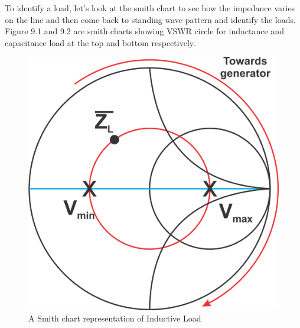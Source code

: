 To identify a load, let's look at the smith chart to see how the impedance varies on the line and then come back to standing wave pattern and identify the loads.\\
Figure 9.1 and 9.2 are smith charts showing VSWR circle for inductance and capacitance load at the top and bottom respectively.\\
\begin{figure}[h]
\centering
\includegraphics[scale=0.4]{./graphics/Group91}
\caption{A Smith chart representation of Inductive Load}
\end{figure}

